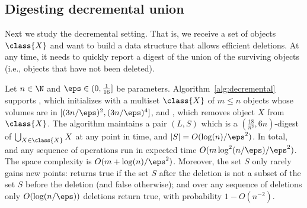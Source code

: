 \subsection{Digesting decremental union}
Next we study the decremental setting. That is, we receive a set of objects $\class{X}$ and want to build a data structure that allows efficient deletions. At any time, it needs to quickly report a digest of the union of the surviving objects (i.e., objects that have not been deleted).
%
\begin{algorithm}[htb]
    \caption{Digest data structure for decremental union}
    \label{alg:decremental}
%
%
\end{algorithm}
%
\begin{lemma}
    \label{lem:decremental}
    Let $n \in \N$ and $\eps \in (0,\frac{1}{16}]$ be parameters. 
    Algorithm~\ref{alg:decremental} supports , which initializes with a multiset $\class{X}$ of $m \le n$ objects whose volumes are in $[(3n/\eps)^2, (3n/\eps)^4]$, and , which removes object $X$ from $\class{X}$. The algorithm maintains a pair $(L,S)$ which is a $(\frac{18}{n^2}, 6n)$-digest of $\bigcup_{X \in \class{X}} X$ at any point in time, and $|S| = O(\log(n)/\eps^2)$.
    In total, \initialize and any sequence of \del operations run in expected time $O(m \log^2(n/\eps) / \eps^2)$. The space complexity is $O(m + \log(n) / \eps^2)$. 
%
    Moreover, the set $S$ only rarely gains new points:  returns true if the set $S$ after the deletion is not a subset of the set $S$ before the deletion (and false otherwise); and over any sequence of deletions only $O(\log(n/\eps))$ deletions return true, with probability $1 - O(n^{-2})$.
\end{lemma}
